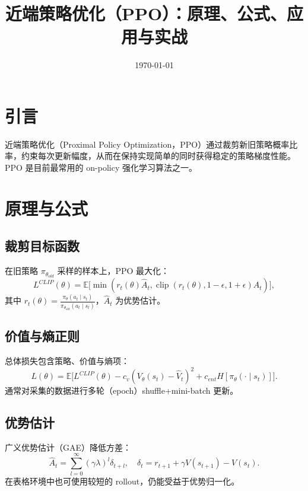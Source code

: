 \documentclass[UTF8,zihao=-4]{ctexart}
\title{近端策略优化（PPO）：原理、公式、应用与实战}
\author{}
\date{\today}
\begin{document}
\maketitle

\section{引言}
近端策略优化（Proximal Policy Optimization，PPO）通过裁剪新旧策略概率比率，约束每次更新幅度，从而在保持实现简单的同时获得稳定的策略梯度性能。PPO 是目前最常用的 on-policy 强化学习算法之一。

\section{原理与公式}
\subsection{裁剪目标函数}
在旧策略 \(\pi_{\theta_{old}}\) 采样的样本上，PPO 最大化：
\begin{equation}
L^{CLIP}(\theta) = \mathbb{E}\big[ \min( r_t(\theta) \hat{A}_t, \operatorname{clip}(r_t(\theta), 1 - \epsilon, 1 + \epsilon) \hat{A}_t ) \big],
\end{equation}
其中 \(r_t(\theta) = \frac{\pi_\theta(a_t\mid s_t)}{\pi_{\theta_{old}}(a_t\mid s_t)}\)，\(\hat{A}_t\) 为优势估计。

\subsection{价值与熵正则}
总体损失包含策略、价值与熵项：
\begin{equation}
L(\theta) = \mathbb{E}\big[ L^{CLIP}(\theta) - c_v (V_\theta(s_t) - \hat{V}_t)^2 + c_{ent} H[\pi_\theta(\cdot\mid s_t)] \big].
\end{equation}
通常对采集的数据进行多轮（epoch）shuffle+mini-batch 更新。

\subsection{优势估计}
广义优势估计（GAE）降低方差：
\begin{equation}
\hat{A}_t = \sum_{l=0}^{\infty} (\gamma \lambda)^l \delta_{t+l},\quad \delta_t = r_{t+1} + \gamma V(s_{t+1}) - V(s_t).
\end{equation}
在表格环境中也可使用较短的 rollout，仍能受益于优势归一化。
\end{document}
